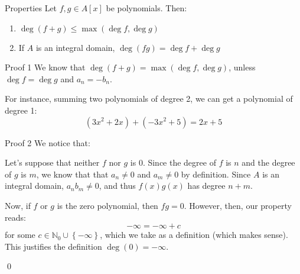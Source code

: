 \documentclass[a4paper]{article}
\begin{document}
\begin{parag}{Properties}
    Let $f, g \in A\left[x\right]$ be polynomials. Then:
    \begin{enumerate}
        \item $\deg\left(f + g\right) \leq \max\left(\deg f, \deg g\right)$
        \item If $A$ is an integral domain, $\deg\left(fg\right) = \deg f + \deg g$
    \end{enumerate}

    \begin{subparag}{Proof 1}
        We know that $\deg\left(f + g\right) = \max\left(\deg f, \deg g\right)$, unless $\deg f = \deg g$ and $a_n = -b_n$.

        For instance, summing two polynomials of degree 2, we can get a polynomial of degree 1:
        \[\left(3x^2 + 2x\right) + \left(-3x^2 + 5\right) = 2x + 5\]
    \end{subparag}
    
    \begin{subparag}{Proof 2}
        We notice that: 
        
        Let's suppose that neither $f$ nor $g$ is $0$. Since the degree of $f$ is $n$ and the degree of $g$ is $m$, we know that that $a_n \neq 0$ and $a_m \neq 0$ by definition. Since $A$ is an integral domain, $a_n b_m \neq 0$, and thus $f\left(x\right)g\left(x\right)$ has degree $n + m$.

        Now, if $f$ or $g$ is the zero polynomial, then $fg = 0$. However, then, our property reads: 
        \[-\infty = -\infty + c\]
        for some $c \in \mathbb{N}_0 \cup \left\{-\infty\right\}$, which we take as a definition (which makes sense). This justifies the definition $\deg\left(0\right) = -\infty$.

        \qed
    \end{subparag}
\end{parag}
\end{document}
